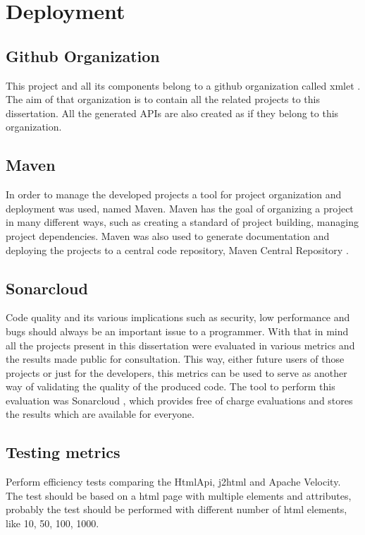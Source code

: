 \chapter{Deployment}
\label{cha:deployment}

\section{Github Organization} %
\label{sec:github}

This project and all its components belong to a github organization called xmlet
. The aim of that organization is to contain all the related projects to this dissertation. All the generated APIs are also created as if they belong to this organization. 

\section{Maven} %
\label{sec:maven}

In order to manage the developed projects a tool for project organization and deployment was used, named Maven. Maven has the goal of organizing a project in many different ways, such as creating a standard of project building, managing project dependencies. Maven was also used to generate documentation and deploying the projects to a central code repository, Maven Central Repository
.

\section{Sonarcloud} %
\label{sec:sonarcloud}

Code quality and its various implications such as security, low performance and bugs should always be an important issue to a programmer. With that in mind all the projects present in this dissertation were evaluated in various metrics and the results made public for consultation. This way, either future users of those projects or just for the developers, this metrics can be used to serve as another way of validating the quality of the produced code. The tool to perform this evaluation was Sonarcloud
, which provides free of charge evaluations and stores the results which are available for everyone.

\section{Testing metrics} %
\label{sec:testingmetrics}

Perform efficiency tests comparing the HtmlApi, j2html and Apache Velocity. The test should be based on a html page with multiple elements and attributes, probably the test should be performed with different number of html elements, like 10, 50, 100, 1000.